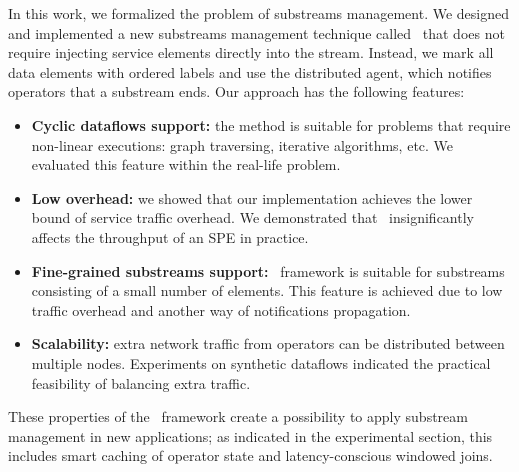 In this work, we formalized the problem of substreams management. We designed and implemented a new substreams management technique called \tracker\ that does not require injecting service elements directly into the stream. Instead, we mark all data elements with ordered labels and use the distributed agent, which notifies operators that a substream ends. Our approach has the following features:

\begin{itemize}
     \item {\bf Cyclic dataflows support:} the method is suitable for problems that require non-linear executions: graph traversing, iterative algorithms, etc. We evaluated this feature within the real-life problem.
     \item {\bf Low overhead:} we showed that our implementation achieves the lower bound of service traffic overhead. We demonstrated that \tracker\ insignificantly affects the throughput of an SPE in practice.
     \item {\bf Fine-grained substreams support:} \tracker\ framework is suitable for substreams consisting of a small number of elements. This feature is achieved due to low traffic overhead and another way of notifications propagation.
     \item {\bf Scalability:} extra network traffic from operators can be distributed between multiple nodes. Experiments on synthetic dataflows indicated the practical feasibility of balancing extra traffic.
\end{itemize}


These properties of the \tracker\ framework create a possibility to apply substream management in new applications; as indicated in the experimental section, this includes smart caching of operator state and latency-conscious windowed joins.


